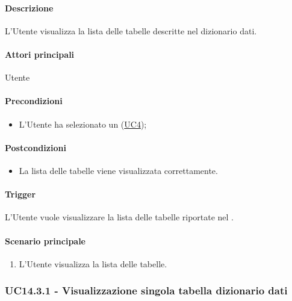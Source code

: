 \paragraph*{Descrizione}
L'Utente visualizza la lista delle tabelle descritte nel dizionario dati.

\paragraph*{Attori principali}
Utente

\paragraph*{Precondizioni}
\begin{itemize}
  \item L'Utente ha selezionato un  (\hyperref[UC4]{UC4});
\end{itemize}

\paragraph*{Postcondizioni}
\begin{itemize}
  \item La lista delle tabelle viene visualizzata correttamente.
\end{itemize}

\paragraph*{Trigger}
L'Utente vuole visualizzare la lista delle tabelle riportate nel .

\paragraph*{Scenario principale}
\begin{enumerate}
  \item L'Utente visualizza la lista delle tabelle.
\end{enumerate}


\subsubsection{UC14.3.1 - Visualizzazione singola tabella dizionario dati}\label{UC14point3point1}

